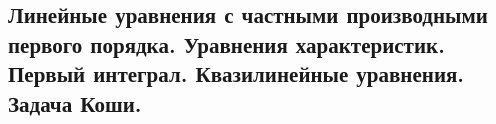 \subsection{Линейные уравнения с частными производными первого порядка. Уравнения характеристик. Первый интеграл. Квазилинейные уравнения. Задача Коши.}
\label{firstorder_lineq}